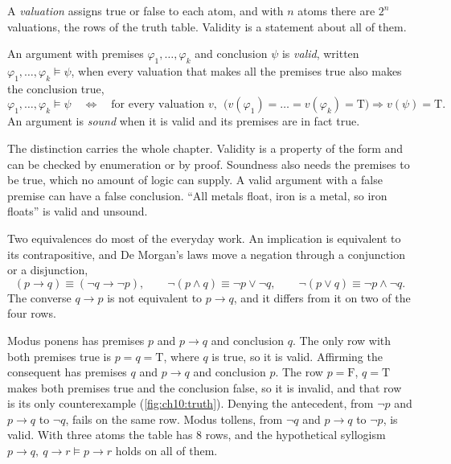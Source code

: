 A \emph{valuation} assigns true or false to each atom, and with $n$ atoms there are $2^n$ valuations, the rows of the truth table. Validity is a statement about all of them.
\begin{definition}\label{def:ch10:valid}
An argument with premises $\varphi_1,\dots,\varphi_k$ and conclusion $\psi$ is \emph{valid}, written $\varphi_1,\dots,\varphi_k\models\psi$, when every valuation that makes all the premises true also makes the conclusion true,
\begin{equation}
\varphi_1,\dots,\varphi_k\models\psi\quad\iff\quad\text{for every valuation }v,\ \ \big(v(\varphi_1)=\dots=v(\varphi_k)=\mathrm{T}\big)\Rightarrow v(\psi)=\mathrm{T}.
\label{eq:ch10:valid}
\end{equation}
An argument is \emph{sound} when it is valid and its premises are in fact true.
\end{definition}
The distinction carries the whole chapter. Validity is a property of the form and can be checked by enumeration or by proof. Soundness also needs the premises to be true, which no amount of logic can supply. A valid argument with a false premise can have a false conclusion. ``All metals float, iron is a metal, so iron floats'' is valid and unsound.

Two equivalences do most of the everyday work. An implication is equivalent to its contrapositive, and De Morgan's laws move a negation through a conjunction or a disjunction,
\begin{equation}
(p\to q)\equiv(\neg q\to\neg p),\qquad \neg(p\wedge q)\equiv\neg p\vee\neg q,\qquad \neg(p\vee q)\equiv\neg p\wedge\neg q.
\label{eq:ch10:equiv}
\end{equation}
The converse $q\to p$ is not equivalent to $p\to q$, and it differs from it on two of the four rows.

\begin{example}\label{ex:ch10:mp}
Modus ponens has premises $p$ and $p\to q$ and conclusion $q$. The only row with both premises true is $p=q=\mathrm{T}$, where $q$ is true, so it is valid. Affirming the consequent has premises $q$ and $p\to q$ and conclusion $p$. The row $p=\mathrm{F}$, $q=\mathrm{T}$ makes both premises true and the conclusion false, so it is invalid, and that row is its only counterexample (\cref{fig:ch10:truth}). Denying the antecedent, from $\neg p$ and $p\to q$ to $\neg q$, fails on the same row. Modus tollens, from $\neg q$ and $p\to q$ to $\neg p$, is valid. With three atoms the table has $8$ rows, and the hypothetical syllogism $p\to q,\ q\to r\models p\to r$ holds on all of them.
\end{example}


